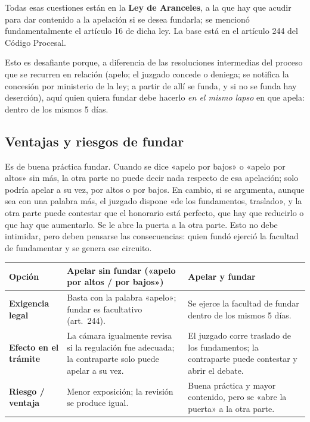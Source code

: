 \documentclass[12pt,oneside]{book}
\begin{document}
Todas esas cuestiones están en la \textbf{Ley de Aranceles}, a la que hay que acudir para dar contenido a la apelación si se desea fundarla; se mencionó fundamentalmente el artículo 16 de dicha ley. La base está en el artículo 244 del Código Procesal.

Esto es desafiante porque, a diferencia de las resoluciones intermedias del proceso que se recurren en relación (apelo; el juzgado concede o deniega; se notifica la concesión por ministerio de la ley; a partir de allí se funda, y si no se funda hay deserción), aquí quien quiera fundar debe hacerlo \emph{en el mismo lapso} en que apela: dentro de los mismos 5 días.


\subsection{Ventajas y riesgos de fundar}

Es de buena práctica fundar. Cuando se dice «apelo por bajos» o «apelo por altos» sin más, la otra parte no puede decir nada respecto de esa apelación; solo podría apelar a su vez, por altos o por bajos. En cambio, si se argumenta, aunque sea con una palabra más, el juzgado dispone «de los fundamentos, traslado», y la otra parte puede contestar que el honorario está perfecto, que hay que reducirlo o que hay que aumentarlo. Se le abre la puerta a la otra parte. Esto no debe intimidar, pero deben pensarse las consecuencias: quien fundó ejerció la facultad de fundamentar y se genera ese circuito.

\begin{table}[H]
\centering
\begin{tabularx}{\textwidth}{>{\raggedright\arraybackslash}p{}>{\raggedright\arraybackslash}X>{\raggedright\arraybackslash}X}
\toprule
\textbf{Opción} & \textbf{Apelar sin fundar («apelo por altos / por bajos»)} & \textbf{Apelar y fundar} \\
\midrule
\textbf{Exigencia legal} & Basta con la palabra «apelo»; fundar es facultativo (art.~244). & Se ejerce la facultad de fundar dentro de los mismos 5 días. \\
\textbf{Efecto en el trámite} & La cámara igualmente revisa si la regulación fue adecuada; la contraparte solo puede apelar a su vez. & El juzgado corre traslado de los fundamentos; la contraparte puede contestar y abrir el debate. \\
\textbf{Riesgo / ventaja} & Menor exposición; la revisión se produce igual. & Buena práctica y mayor contenido, pero se «abre la puerta» a la otra parte. \\
\bottomrule
\end{tabularx}
\end{table}
\end{document}
